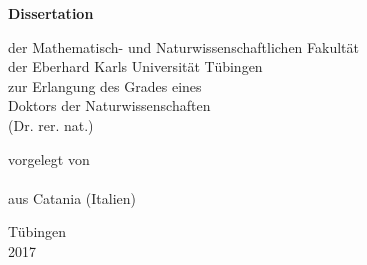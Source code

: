 {

\makeatletter
\centering
\renewcommand{\baselinestretch}{1.5}\selectfont
\parskip 0pt

\vspace*{-2cm}

{\huge \bfseries
  \@title\par}

\vspace{4cm}

{\large \bfseries Dissertation}\\
%
%
{\large der Mathematisch- und Naturwissenschaftlichen Fakult\"at\\
der Eberhard Karls Universit\"at T\"ubingen\\
zur Erlangung des Grades eines\\
Doktors der Naturwissenschaften\\
(Dr. rer. nat.)%
\par}

\vspace{4 cm}

{\large vorgelegt von \\
\@author \\
aus Catania (Italien)\par}

\vspace{2 cm}

{\large T\"ubingen\\
  2017\par}

\vfill
\makeatother
}
